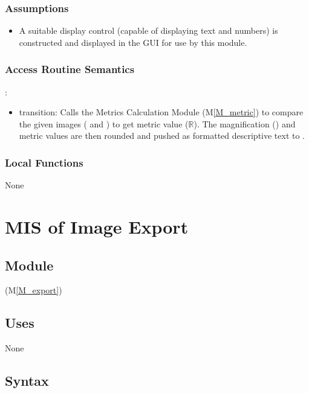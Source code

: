 \documentclass[12pt, titlepage]{article}
\newcommand{\mref}[1]{M\ref{#1}}
\newcommand{\mrefp}[1]{(\mref{#1})}
\newcommand{\mreff}[1]{Module \mrefp{#1}}
\begin{document}
\subsubsection{Assumptions}
\begin{itemize}
  \item A suitable display control (capable of displaying text and numbers) is constructed
  and displayed in the GUI for use by this module.
\end{itemize}

\subsubsection{Access Routine Semantics}

\noindent {}:
\begin{itemize}
\item transition: Calls the Metrics Calculation \mreff{M_metric} to compare the given images
  ( and ) to get metric value ($\mathbb{R}$).
  The magnification () and metric values are then rounded 
  and pushed as formatted descriptive text to .
\end{itemize}

\subsubsection{Local Functions}
None

\newpage



\section{MIS of Image Export} \label{MS_ImageExport}

\subsection{Module}
 \mrefp{M_export}

\subsection{Uses}
None

\subsection{Syntax}
\end{document}
